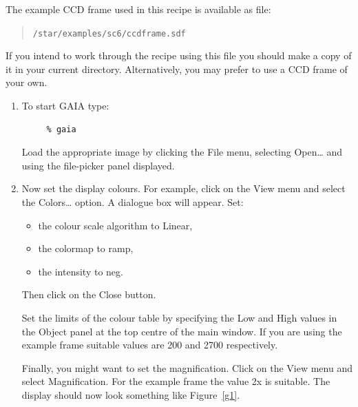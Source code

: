 \documentclass[twoside,11pt]{article}
\begin{document}
The example CCD frame used in this recipe is available as file:

\begin{verse}
{\tt /star/examples/sc6/ccdframe.sdf}
\end{verse}

If you intend to work through the recipe using this file you should make
a copy of it in your current directory.  Alternatively, you may prefer
to use a CCD frame of your own.

\begin{enumerate}

  \item To start GAIA type:

\begin{verbatim}
     % gaia
\end{verbatim}

   Load the appropriate image by clicking the {\sf File} menu,
   selecting {\sf Open\ldots} and using the file-picker panel displayed.

  \item Now set the display colours.  For example, click on the {\sf
   View} menu and select the {\sf Colors\ldots} option.  A dialogue box
   will appear.  Set:

  \begin{itemize}

    \item the colour scale algorithm to {\sf Linear},

    \item the colormap to {\sf ramp}, 

    \item the intensity to {\sf neg}.  

  \end{itemize}

   Then click on the {\sf Close} button.

   Set the limits of the colour table by specifying the {\sf Low} and
   {\sf High} values in the {\sf Object} panel at the top centre of the
   main window.  If you are using the example frame suitable values are
   200 and 2700 respectively.

   Finally, you might want to set the magnification.  Click on the {\sf
   View} menu and select {\sf Magnification}.  For the example frame
   the value {\sf 2x} is suitable.  The display should now look something
   like Figure~\ref{g1}.


\end{enumerate}
\end{document}
